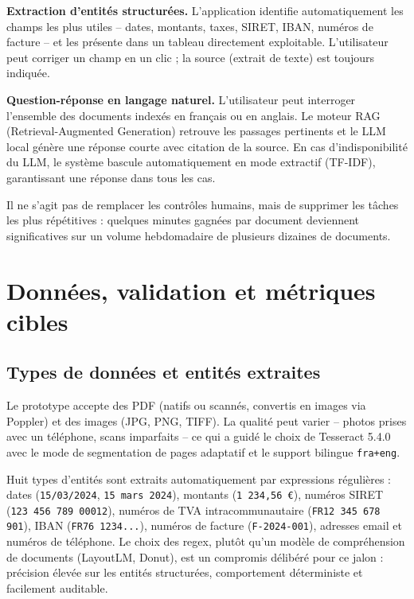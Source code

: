 \documentclass[11pt,a4paper]{article}
\begin{document}
\textbf{Extraction d'entités structurées.} L'application identifie automatiquement les champs les plus utiles -- dates, montants, taxes, SIRET, IBAN, numéros de facture -- et les présente dans un tableau directement exploitable. L'utilisateur peut corriger un champ en un clic ; la source (extrait de texte) est toujours indiquée.

\textbf{Question-réponse en langage naturel.} L'utilisateur peut interroger l'ensemble des documents indexés en français ou en anglais. Le moteur RAG (Retrieval-Augmented Generation) retrouve les passages pertinents et le LLM local génère une réponse courte avec citation de la source. En cas d'indisponibilité du LLM, le système bascule automatiquement en mode extractif (TF-IDF), garantissant une réponse dans tous les cas.

Il ne s'agit pas de remplacer les contrôles humains, mais de supprimer les tâches les plus répétitives : quelques minutes gagnées par document deviennent significatives sur un volume hebdomadaire de plusieurs dizaines de documents.

\section{Données, validation et métriques cibles}

\subsection{Types de données et entités extraites}

Le prototype accepte des PDF (natifs ou scannés, convertis en images via Poppler) et des images (JPG, PNG, TIFF). La qualité peut varier -- photos prises avec un téléphone, scans imparfaits -- ce qui a guidé le choix de Tesseract 5.4.0 avec le mode de segmentation de pages adaptatif et le support bilingue \texttt{fra+eng}.

Huit types d'entités sont extraits automatiquement par expressions régulières : dates (\texttt{15/03/2024}, \texttt{15 mars 2024}), montants (\texttt{1 234,56 €}), numéros SIRET (\texttt{123 456 789 00012}), numéros de TVA intracommunautaire (\texttt{FR12 345 678 901}), IBAN (\texttt{FR76 1234...}), numéros de facture (\texttt{F-2024-001}), adresses email et numéros de téléphone. Le choix des regex, plutôt qu'un modèle de compréhension de documents (LayoutLM, Donut), est un compromis délibéré pour ce jalon : précision élevée sur les entités structurées, comportement déterministe et facilement auditable.
\end{document}
